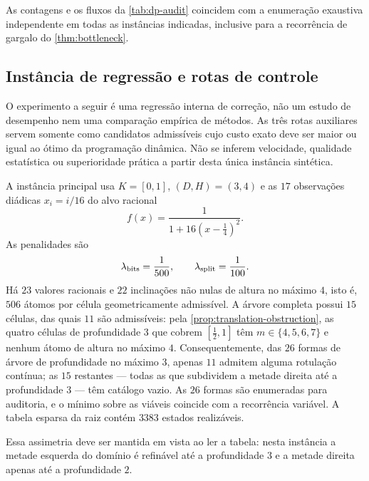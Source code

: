 \begin{table}[t]
 \centering
 \caption{Verificações executáveis das duas instâncias.}
 \label{tab:dp-audit}
 \small
 
\end{table}

As contagens e os fluxos da \cref{tab:dp-audit} coincidem com a enumeração
exaustiva independente em todas as instâncias indicadas, inclusive para a
recorrência de gargalo do \cref{thm:bottleneck}.

\subsection{Instância de regressão e rotas de controle}

O experimento a seguir é uma regressão interna de correção, não um estudo de
desempenho nem uma comparação empírica de métodos. As três rotas auxiliares
servem somente como candidatos admissíveis cujo custo exato deve ser maior ou
igual ao ótimo da programação dinâmica. Não se inferem velocidade, qualidade
estatística ou superioridade prática a partir desta única instância sintética.

A instância principal usa $K=[0,1]$, $(D,H)=(3,4)$ e as $17$ observações
diádicas $x_i=i/16$ do alvo racional
\begin{equation}
 f(x)=\frac{1}{1+16(x-\tfrac14)^2}.
 \label{eq:experiment-target}
\end{equation}
As penalidades são
\[
 \lambda_{\rm bits}=\frac1{500},
 \qquad
 \lambda_{\rm split}=\frac1{100}.
\]
Há $23$ valores racionais e $22$ inclinações não nulas de altura no máximo
$4$, isto é, $506$ átomos por célula geometricamente admissível. A árvore
completa possui $15$ células, das quais $11$ são admissíveis: pela
\cref{prop:translation-obstruction}, as quatro células de profundidade $3$ que
cobrem $[\tfrac12,1]$ têm $m\in\{4,5,6,7\}$ e nenhum átomo de altura no
máximo $4$. Consequentemente, das $26$ formas de árvore de profundidade no
máximo $3$, apenas $11$ admitem alguma rotulação contínua; as $15$ restantes
--- todas as que subdividem a metade direita até a profundidade $3$ --- têm
catálogo vazio. As $26$ formas são enumeradas para auditoria, e o mínimo sobre
as viáveis coincide com a recorrência variável. A tabela esparsa da raiz
contém $3383$ estados realizáveis.

Essa assimetria deve ser mantida em vista ao ler a tabela: nesta instância a
metade esquerda do domínio é refinável até a profundidade $3$ e a metade
direita apenas até a profundidade $2$.

